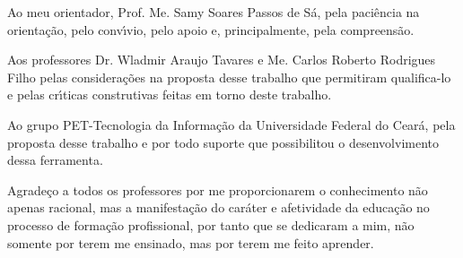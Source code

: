 Ao meu orientador, Prof. Me. Samy Soares Passos de S\'{a}, pela paci\^{e}ncia na orienta\c{c}\~{a}o, pelo conv\'{\i}vio, pelo apoio e, principalmente, pela compreens\~{a}o.

Aos professores Dr. Wladmir Araujo Tavares e Me. Carlos Roberto Rodrigues Filho pelas considera\c{c}\~{o}es na proposta desse trabalho que permitiram qualifica-lo e pelas cr\'{\i}ticas construtivas feitas em torno deste trabalho.

Ao grupo PET-Tecnologia da Informa\c{c}\~{a}o da Universidade Federal do Cear\'{a}, pela proposta desse trabalho e por todo suporte que possibilitou o desenvolvimento dessa ferramenta.

Agrade\c{c}o a todos os professores por me proporcionarem o conhecimento n\~{a}o apenas racional, mas a manifesta\c{c}\~{a}o do car\'{a}ter e afetividade da educa\c{c}\~{a}o no processo de forma\c{c}\~{a}o profissional, por tanto que se dedicaram a mim, n\~{a}o somente por terem me ensinado, mas por terem me feito aprender. 


